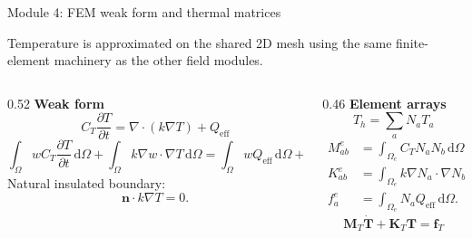 \documentclass[aspectratio=169,9pt]{beamer}
\newcommand{\dd}{\,\mathrm{d}}
\newcommand{\grad}{\nabla}
\newcommand{\divg}{\nabla\!\cdot}
\newcommand{\vect}[1]{\bm{#1}}
\newcommand{\mat}[1]{\mathbf{#1}}
\begin{document}
\begin{frame}{Module 4: FEM weak form and thermal matrices}
\footnotesize
\vspace{-3mm}
\begin{bluebox}
\centering
Temperature is approximated on the shared 2D mesh using the same finite-element machinery as the other field modules.
\end{bluebox}

\vspace{1mm}
\begin{columns}[T,totalwidth=\textwidth]
\begin{column}{0.52\textwidth}
\textbf{Weak form}
\begin{equation*}
C_T\frac{\partial T}{\partial t}=\divg(k\grad T)+Q_{\mathrm{eff}}
\end{equation*}
\begin{equation*}
\boxed{\int_\Omega w C_T\frac{\partial T}{\partial t}\dd\Omega
+\int_\Omega k\grad w\cdot\grad T\dd\Omega
=\int_\Omega wQ_{\mathrm{eff}}\dd\Omega+\int_{\Gamma_N}w\bar{q}\dd\Gamma}
\end{equation*}
\small
Natural insulated boundary:
\begin{equation*}
\boxed{\vect{n}\cdot k\grad T=0.}
\end{equation*}
\end{column}
\begin{column}{0.46\textwidth}
\textbf{Element arrays}
\begin{equation*}
T_h=\sum_aN_aT_a
\end{equation*}
{\scriptsize
\begin{align*}
M^e_{ab}&=\int_{\Omega_e}C_TN_aN_b\dd\Omega,\\
K^e_{ab}&=\int_{\Omega_e}k\grad N_a\cdot\grad N_b\dd\Omega,\\
f^e_a&=\int_{\Omega_e}N_aQ_{\mathrm{eff}}\dd\Omega.
\end{align*}}
\begin{equation*}
\boxed{\mat{M}_T\dot{\vect{T}}+\mat{K}_T\vect{T}=\vect{f}_T}
\end{equation*}
\end{column}
\end{columns}
\end{frame}
\end{document}
